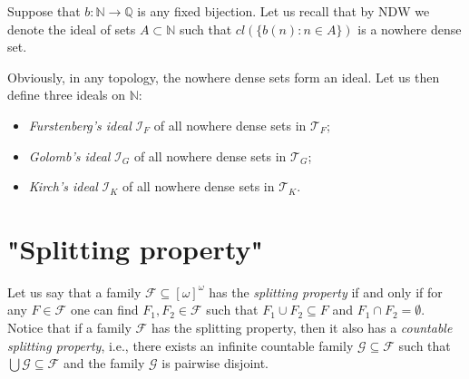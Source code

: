 \documentclass{amsart}
\theoremstyle{definition}
\theoremstyle{definition}
\newcommand{\N}{{\mathbb N}}
\newcommand{\Q}{{\mathbb Q}}
\newcommand{\I}{\mathcal I}
\newcommand{\T}{\mathcal{T}}
\begin{document}


Suppose that $b\colon\N\to\Q$ is any fixed bijection.
Let us recall that by $\mathrm{NDW}$ we denote the ideal of sets
$A \subset \N$ such that $\mathit{cl}(\lbrace b(n)\colon n \in A\rbrace)$
is a nowhere dense set.

Obviously, in any topology, the nowhere dense sets form an ideal. Let us then define three ideals on $\N$:
\begin{itemize}
\item \emph{Furstenberg's ideal} $\I_F$ of all nowhere dense sets in $\T_F$;
\item \emph{Golomb's ideal} $\I_G$ of all nowhere dense sets in $\T_G$;
\item \emph{Kirch's ideal} $\I_K$ of all nowhere dense sets in $\T_K$.
\end{itemize}


\section*{"Splitting property"}



Let us say that a family $\mathcal{F} \subseteq [\omega]^\omega$ has the \emph{splitting property} if and only if for any $F \in \mathcal{F}$ one can find $F_1, F_2 \in \mathcal{F}$ such that $F_1 \cup F_2 \subseteq F$ and $F_1 \cap F_2 = \emptyset$. Notice that if a family $\mathcal{F}$ has the splitting property, then it also has a \emph{countable splitting property}, i.e., there exists an infinite countable family $\mathcal{G} \subseteq \mathcal{F}$ such that $\bigcup \mathcal{G} \subseteq \mathcal{F}$ and the family $\mathcal{G}$ is pairwise disjoint.
\end{document}
